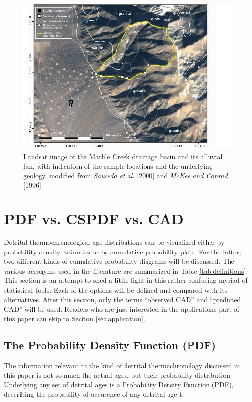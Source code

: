 \documentclass[12pt,twoside]{article}
\begin{document}
\begin{figure}[here]
  \centering
  \includegraphics[width=\textwidth]{fig2.jpg}
  \caption[AFT sample locations]
  {Landsat image of  the Marble Creek drainage basin  and its alluvial
    fan, with  indication of the  sample locations and  the underlying
    geology, modified from {\it Saucedo  et al.} [2000] and {\it McKee
      and Conrad} [1996].}
\label{fig:landsat}
\end{figure}

\section{PDF vs. CSPDF vs. CAD}
\label{sec:pdfcspdfcad}

Detrital  thermochronological  age  distributions  can  be  visualized
either by  probability density estimates or  by cumulative probability
plots. For  the latter, two different kinds  of cumulative probability
diagrams  will  be  discussed.   The  various  acronyms  used  in  the
literature  are  summarized   in  Table  \ref{tab:definitions}.   This
section is an attempt to shed  a little light in this rather confusing
myriad of statistical tools.  Each  of the options will be defined and
compared with  its alternatives.  After  this section, only  the terms
``observed CAD'' and ``predicted CAD''  will be used.  Readers who are
just interested  in the  applications part of  this paper can  skip to
Section \ref{sec:application}.

\subsection{The Probability Density Function (PDF)}
The  information relevant  to  the kind  of detrital  thermochronology
discussed in  this paper  is not  so much the  actual ages,  but their
probability distribution.   Underlying any set  of detrital ages  is a
Probability  Density  Function (PDF),  describing  the probability  of
occurence of any detrital age t:
\end{document}
